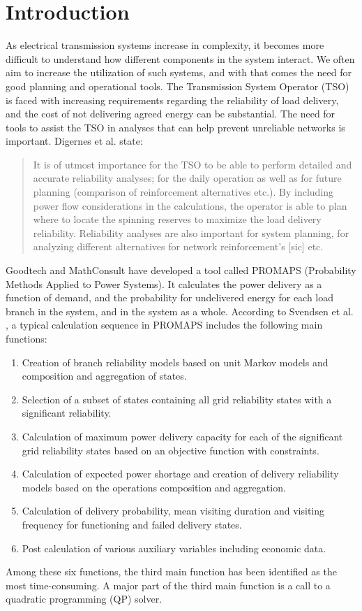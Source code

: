 \documentclass[a4paper,12pt]{report}
\begin{document}
\chapter{Introduction}
\label{ch:intro}
As electrical transmission systems increase in complexity, it becomes
more difficult to understand how different components in the system interact.
We often aim to increase the utilization of such systems, and with that comes
the need for good planning and operational tools.
The Transmission System Operator (TSO) is faced
with increasing requirements regarding the reliability of load
delivery, and the cost of not delivering agreed energy can be
substantial.
The need for tools to assist the TSO in analyses that can help prevent
unreliable networks is important.
Digernes et al. \cite{digernes} state:
\begin{quote}
It is of utmost importance for the TSO to be able to perform detailed and
accurate reliability analyses; for the daily operation as well as for
future planning (comparison of reinforcement alternatives etc.). By
including power flow considerations in the calculations, the operator is
able to plan where to locate the spinning reserves to maximize the load
delivery reliability. Reliability analyses are also important for system
planning, for analyzing different alternatives for network reinforcement's
[sic] etc.\cite{digernes}
\end{quote}

Goodtech and MathConsult have developed a tool called PROMAPS
(Probability Methods Applied to Power Systems). It calculates the power
delivery as a function of demand, and the probability for undelivered
energy for each load branch in the system, and in the system as a whole.
According to Svendsen et al. \cite{trond}, a typical calculation sequence
in PROMAPS includes the following main functions:
\begin{enumerate}
\item Creation of branch reliability models based on unit Markov models and
      composition and aggregation of states.
\item Selection of a subset of states containing all grid reliability states
      with a significant reliability.
\item Calculation of maximum power delivery capacity for each of the
      significant grid reliability states based on an objective function with
      constraints.
\item Calculation of expected power shortage and creation of delivery
      reliability models based on the operations composition and aggregation.
\item Calculation of delivery probability, mean visiting duration and visiting
      frequency for functioning and failed delivery states.
\item Post calculation of various auxiliary variables including economic data.
\end{enumerate}
Among these six functions, the third main function has been identified as the
most time-consuming. A major part of the third main function is a call to a
quadratic programming (QP) solver\cite{trond}.
\end{document}
